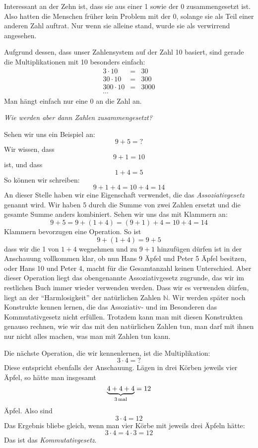 Interessant an der Zehn ist, dass sie aus einer 1 sowie der 0 zusammengesetzt ist. Also hatten die Menschen früher kein Problem mit der 0, solange sie als Teil einer anderen Zahl auftrat. Nur wenn sie alleine stand, wurde sie als verwirrend angesehen.

Aufgrund dessen, dass unser Zahlensystem auf der Zahl 10 basiert, sind gerade die Multiplikationen mit 10 besonders einfach: 
\begin{eqnarray*}
3\cdot 10 &=& 30 \\
30\cdot 10 &=& 300 \\
300\cdot 10 &=& 3000\\
\cdots
\end{eqnarray*}
Man hängt einfach nur eine 0 an die Zahl an.

\bigskip

\noindent \textsl{Wie werden aber dann Zahlen zusammengesetzt?}

\noindent Sehen wir uns ein Beispiel an:
\[9+5 = ?\]
Wir wissen, dass 
\[9+1 = 10\]
ist, und dass
\[1+4 = 5\]
So können wir schreiben:
\[9+1+4 = 10 + 4 = 14\]
An dieser Stelle haben wir eine Eigenschaft verwendet, die das \textsl{Assoziativgesetz} genannt wird. Wir haben 5 durch die Summe von zwei Zahlen ersetzt und die gesamte Summe anders kombiniert. Sehen wir uns das mit Klammern an:
\[9+5 = 9+(1+4) = (9+1)+4 = 10+4 = 14\]
Klammern bevorzugen eine Operation. So ist
\[9+(1+4)=9+5\]
dass wir die 1 von $1+4$ wegnehmen und zu $9+1$ hinzufügen dürfen ist in der Anschauung vollkommen klar, ob nun Hans 9 Äpfel und Peter 5 Äpfel besitzen, oder Hans 10 und Peter 4, macht für die Gesamtanzahl keinen Unterschied. Aber dieser Operation liegt das obengenannte Assoziativgesetz zugrunde, das wir im restlichen Buch immer wieder verwenden werden. Dass wir es verwenden dürfen, liegt an der "`Harmlosigkeit"' der natürlichen Zahlen $\mathbb{N}$. Wir werden später noch Konstrukte kennen lernen, die das Assoziativ- und im Besonderen das Kommutativgesetz nicht erfüllen. Trotzdem kann man mit diesen Konstrukten genauso rechnen, wie wir das mit den natürlichen Zahlen tun, man darf mit ihnen nur nicht alles machen, was man mit Zahlen tun kann.

Die nächste Operation, die wir kennenlernen, ist die Multiplikation:
\[3\cdot 4 = ?\]
Diese entspricht ebenfalls der Anschauung. Lägen in drei Körben jeweils vier Äpfel, so hätte man insgesamt
\[\underbrace{4+4+4}_{3 \, \textnormal{mal}} = 12\]
Äpfel. Also sind 
\[3\cdot 4 = 12\]
Das Ergebnis bliebe gleich, wenn man vier Körbe mit jeweils drei Äpfeln hätte:
\[3\cdot 4 = 4\cdot 3 = 12\]
Das ist das \textsl{Kommutativgesetz}.

